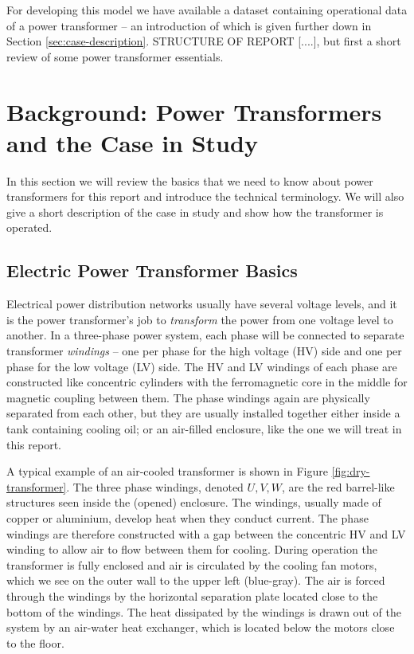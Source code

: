 \documentclass[]{article}
\begin{document}
For developing this model we have available a dataset containing operational data of a power transformer -- an introduction of which is given further down in Section \ref{sec:case-description}. STRUCTURE OF REPORT [....], but first a short review of some power transformer essentials.


\section{Background: Power Transformers and the Case in Study}
In this section we will review the basics that we need to know about power transformers for this report and introduce the technical terminology. We will also give a short description of the case in study and show how the transformer is operated.

\subsection{Electric Power Transformer Basics} \label{sec:transformers}
Electrical power distribution networks usually have several voltage levels, and it is the power transformer's job to \textit{transform} the power from one voltage level to another. In a three-phase power system, each phase will be connected to separate transformer \textit{windings} -- one per phase for the high voltage (HV) side and one per phase for the low voltage (LV) side. The HV and LV windings of each phase are constructed like concentric cylinders with the ferromagnetic core in the middle for magnetic coupling between them. The phase windings again are physically separated from each other, but they are usually installed together either inside a tank containing cooling oil; or an air-filled enclosure, like the one we will treat in this report. 

A typical example of an air-cooled transformer is shown in Figure \ref{fig:dry-transformer}. The three phase windings, denoted $U, V, W$, are the red barrel-like structures seen inside the (opened) enclosure. The windings, usually made of copper or aluminium, develop heat when they conduct current. The phase windings are therefore constructed with a gap between the concentric HV and LV winding to allow air to flow between them for cooling. During operation the transformer is fully enclosed and air is circulated by the cooling fan motors, which we see on the outer wall to the upper left (blue-gray). The air is forced through the windings by the horizontal separation plate located close to the bottom of the windings. The heat dissipated by the windings is drawn out of the system by an air-water heat exchanger, which is located below the motors close to the floor. 
\end{document}
